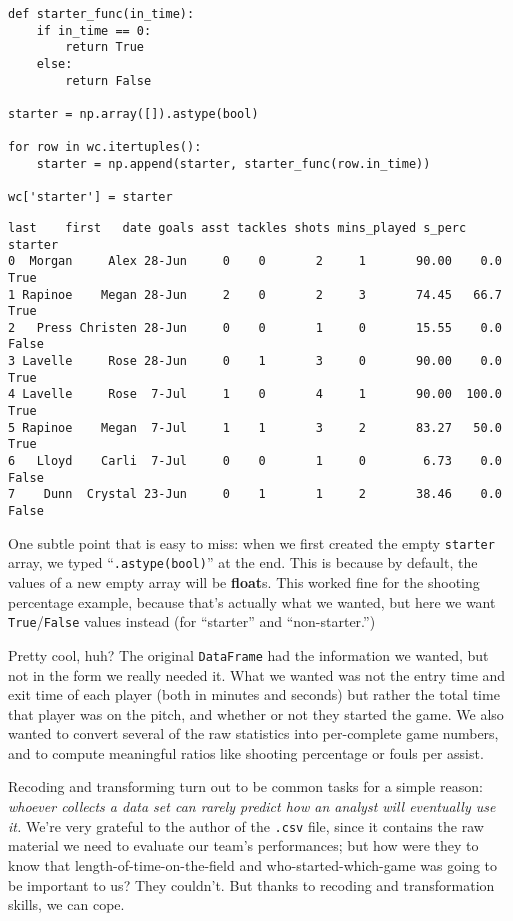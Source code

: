 \begin{Verbatim}[fontsize=\small,samepage=true,frame=single,framesep=3mm]
def starter_func(in_time):
    if in_time == 0:
        return True
    else:
        return False

starter = np.array([]).astype(bool)

for row in wc.itertuples():
    starter = np.append(starter, starter_func(row.in_time))

wc['starter'] = starter
\end{Verbatim}
\vspace{-.2in}

\begin{Verbatim}[fontsize=\small,samepage=true,frame=leftline,framesep=5mm,framerule=1mm]
     last    first   date goals asst tackles shots mins_played s_perc starter
0  Morgan     Alex 28-Jun     0    0       2     1       90.00    0.0    True
1 Rapinoe    Megan 28-Jun     2    0       2     3       74.45   66.7    True
2   Press Christen 28-Jun     0    0       1     0       15.55    0.0   False
3 Lavelle     Rose 28-Jun     0    1       3     0       90.00    0.0    True
4 Lavelle     Rose  7-Jul     1    0       4     1       90.00  100.0    True
5 Rapinoe    Megan  7-Jul     1    1       3     2       83.27   50.0    True
6   Lloyd    Carli  7-Jul     0    0       1     0        6.73    0.0   False
7    Dunn  Crystal 23-Jun     0    1       1     2       38.46    0.0   False
\end{Verbatim}


One subtle point that is easy to miss: when we first created the empty
\texttt{starter} array, we typed ``\texttt{.astype(bool)}'' at the end. This is
because by default, the values of a new empty array will be \textbf{float}s.
This worked fine for the shooting percentage example, because that's actually
what we wanted, but here we want \texttt{True}/\texttt{False} values instead
(for ``starter'' and ``non-starter.'')

Pretty cool, huh? The original \texttt{DataFrame} had the information we
wanted, but not in the form we really needed it. What we wanted was not the
entry time and exit time of each player (both in minutes and seconds) but
rather the total time that player was on the pitch, and whether or not they
started the game. We also wanted to convert several of the raw statistics into
per-complete game numbers, and to compute meaningful ratios like shooting
percentage or fouls per assist.

\bigskip

Recoding and transforming turn out to be common tasks for a simple reason:
\textit{whoever collects a data set can rarely predict how an analyst will
eventually use it.} We're very grateful to the author of the \texttt{.csv}
file, since it contains the raw material we need to evaluate our team's
performances; but how were they to know that length-of-time-on-the-field and
who-started-which-game was going to be important to us? They couldn't. But
thanks to recoding and transformation skills, we can cope.

